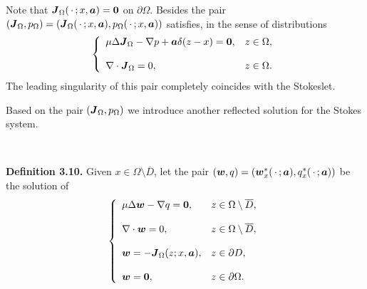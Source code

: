 Note that $\mbox{\boldmath $J$}_{\Omega}(\,\cdot\,;x,\mbox{\boldmath $a$})=\mbox{\boldmath $0$}$ on $\partial\Omega$.
Besides the pair $(\mbox{\boldmath $J$}_{\Omega},p_{\Omega})=(\mbox{\boldmath $J$}_{\Omega}(\,\cdot\,;x,\mbox{\boldmath $a$}), p_{\Omega}(\,\cdot\,;x,\mbox{\boldmath $a$}))$
satisfies, in the sense of distributions
$$\left\{
 \begin{array}{ll}
 \mu\Delta\mbox{\boldmath $J$}_{\Omega}-\nabla p+\mbox{\boldmath $a$}
 \delta(z-x)=\mbox{\boldmath $0$}, & z\in\Omega,
 \\
 \\
 \displaystyle
 \nabla\cdot\mbox{\boldmath $J$}_{\Omega}=0, &  z\in\Omega.
 \end{array}
 \right.
 $$
The leading singularity of this pair completely coincides with the Stokeslet.



Based on the pair $(\mbox{\boldmath $J$}_{\Omega},p_{\Omega})$ we introduce another reflected solution for the Stokes system.













$\quad$


  
 {\bf\noindent Definition 3.10.}
 Given $x\in\Omega\setminus\overline{D}$, let the pair $(\mbox{\boldmath $w$}, q)=(\mbox{\boldmath $w$}_x^*(\,\cdot\,;\mbox{\boldmath $a$}), q_x^*(\,\cdot\,;\mbox{\boldmath $a$}))$ be the solution of
  $$\left\{
 \begin{array}{ll}
 \mu\Delta\mbox{\boldmath $w$}-\nabla q=\mbox{\boldmath $0$}, & z\in\Omega\setminus\overline{D},
 \\
 \\
 \displaystyle
 \nabla\cdot\mbox{\boldmath $w$}=0, &  z\in\Omega\setminus\overline{D},
 \\
 \\
 \displaystyle
 \mbox{\boldmath $w$}=-\mbox{\boldmath $J$}_{\Omega}(z;x,\mbox{\boldmath $a$}), & z\in\partial D,
 \\
 \\
 \displaystyle
 \mbox{\boldmath $w$}=\mbox{\boldmath $0$}, & z\in\partial\Omega.
 \end{array}
 \right.
 $$
  
  
  
  $\quad$
  
